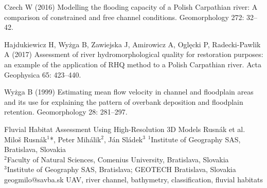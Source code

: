 {Czech W (2016) Modelling the flooding capacity of a Polish Carpathian river: A comparison of constrained and free channel conditions. Geomorphology 272: 32–42. 
	
Hajdukiewicz H, Wyżga B, Zawiejska J, Amirowicz A, Oglęcki P, Radecki-Pawlik A (2017) Assessment of river hydromorphological quality for restoration purposes: an example of the application of RHQ method to a Polish Carpathian river. Acta Geophysica 65: 423–440. 

Wyżga B (1999) Estimating mean flow velocity in channel and floodplain areas and its use for explaining the pattern of overbank deposition and floodplain retention. Geomorphology 28: 281–297. 
}%

\abstract
{Fluvial Habitat Assessment Using High-Resolution 3D Models} %
{Rusnák et al.} %
{Miloš Rusnák$^1$*, Peter Mihálik$^2$, Ján Sládek$^3$} %
{\KLtag} %
{
$^1$Institute of Geography SAS, Bratislava, Slovakia\\
$^2$Faculty of Natural Sciences, Comenius University, Bratislava, Slovakia\\
$^3$Institute of Geography SAS, Bratislava; GEOTECH Bratislava, Slovakia\\
} %
{geogmilo@savba.sk}  %
{UAV, river channel, bathymetry, classification, fluvial habitats}%
